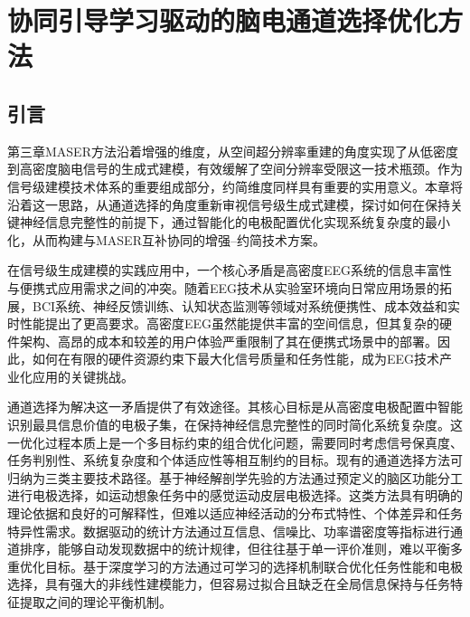 
\chapter{协同引导学习驱动的脑电通道选择优化方法}


\section{引言}

第三章MASER方法沿着增强的维度，从空间超分辨率重建的角度实现了从低密度到高密度脑电信号的生成式建模，有效缓解了空间分辨率受限这一技术瓶颈。作为信号级建模技术体系的重要组成部分，约简维度同样具有重要的实用意义。本章将沿着这一思路，从通道选择的角度重新审视信号级生成式建模，探讨如何在保持关键神经信息完整性的前提下，通过智能化的电极配置优化实现系统复杂度的最小化，从而构建与MASER互补协同的增强--约简技术方案。


在信号级生成建模的实践应用中，一个核心矛盾是高密度EEG系统的信息丰富性与便携式应用需求之间的冲突。随着EEG技术从实验室环境向日常应用场景的拓展\cite{casson2010wearable}，BCI系统、神经反馈训练、认知状态监测等领域对系统便携性、成本效益和实时性能提出了更高要求\cite{debener2012taking, stopczynski2014smartphone}。高密度EEG虽然能提供丰富的空间信息，但其复杂的硬件架构、高昂的成本和较差的用户体验严重限制了其在便携式场景中的部署。因此，如何在有限的硬件资源约束下最大化信号质量和任务性能，成为EEG技术产业化应用的关键挑战。

通道选择为解决这一矛盾提供了有效途径。其核心目标是从高密度电极配置中智能识别最具信息价值的电极子集，在保持神经信息完整性的同时简化系统复杂度。这一优化过程本质上是一个多目标约束的组合优化问题，需要同时考虑信号保真度、任务判别性、系统复杂度和个体适应性等相互制约的目标。现有的通道选择方法可归纳为三类主要技术路径。基于神经解剖学先验的方法通过预定义的脑区功能分工进行电极选择\cite{demuru2020comparison, luck2000event, nomenclature1991american}，如运动想象任务中的感觉运动皮层电极选择。这类方法具有明确的理论依据和良好的可解释性，但难以适应神经活动的分布式特性、个体差异和任务特异性需求。数据驱动的统计方法通过互信息、信噪比、功率谱密度等指标进行通道排序\cite{handiru2016optimized, yang2024improving}，能够自动发现数据中的统计规律，但往往基于单一评价准则，难以平衡多重优化目标。基于深度学习的方法通过可学习的选择机制联合优化任务性能和电极选择\cite{craik2019deep, zhang2021motor, alotaiby2015review}，具有强大的非线性建模能力，但容易过拟合且缺乏在全局信息保持与任务特征提取之间的理论平衡机制。


